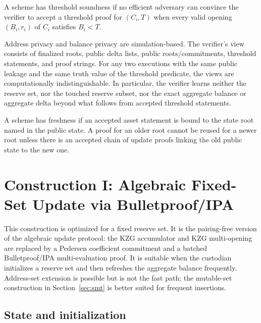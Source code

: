 \documentclass[runningheads]{llncs}
\begin{document}
\begin{definitionx}
A scheme has threshold soundness if no efficient adversary can convince the verifier to accept a threshold proof for \((C_i,T)\) when every valid opening \((B_i,r_i)\) of \(C_i\) satisfies \(B_i<T\).
\end{definitionx}

\begin{definitionx}[Privacy]
Address privacy and balance privacy are simulation-based.  The verifier's view consists of finalized roots, public delta lists, public roots/commitments, threshold statements, and proof strings.  For any two executions with the same public leakage and the same truth value of the threshold predicate, the views are computationally indistinguishable.  In particular, the verifier learns neither the reserve set, nor the touched reserve subset, nor the exact aggregate balance or aggregate delta beyond what follows from accepted threshold statements.
\end{definitionx}

\begin{definitionx}[Freshness]
A scheme has freshness if an accepted asset statement is bound to the state root named in the public state.  A proof for an older root cannot be reused for a newer root unless there is an accepted chain of update proofs linking the old public state to the new one.
\end{definitionx}

\section{Construction I: Algebraic Fixed-Set Update via Bulletproof/IPA}

This construction is optimized for a fixed reserve set.  It is the pairing-free version of the algebraic update protocol: the KZG accumulator and KZG multi-opening are replaced by a Pedersen coefficient commitment and a batched Bulletproof/IPA multi-evaluation proof.  It is suitable when the custodian initializes a reserve set and then refreshes the aggregate balance frequently.  Address-set extension is possible but is not the fast path; the mutable-set construction in Section~\ref{sec:smt} is better suited for frequent insertions.

\subsection{State and initialization}
\end{document}
